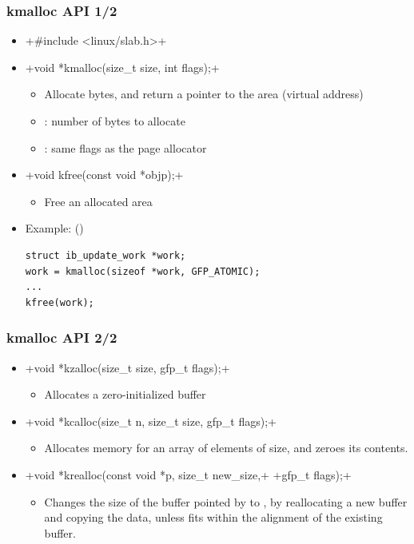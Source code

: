 \begin{frame}[fragile]
  \frametitle{kmalloc API 1/2}
  \begin{itemize}
  \item {}+#include <linux/slab.h>+
  \item {}+void *kmalloc(size_t size, int flags);+
    \begin{itemize}
    \item Allocate  bytes, and return a pointer to the area
      (virtual address)
    \item {}: number of bytes to allocate
    \item {}: same flags as the page allocator
    \end{itemize}
  \item {}+void kfree(const void *objp);+
    \begin{itemize}
    \item Free an allocated area
    \end{itemize}
  \item Example: ()
\begin{verbatim}
struct ib_update_work *work;
work = kmalloc(sizeof *work, GFP_ATOMIC);
...
kfree(work);
\end{verbatim}
  \end{itemize}
\end{frame}

\begin{frame}[fragile]
  \frametitle{kmalloc API 2/2}
  \begin{itemize}
  \item {}+void *kzalloc(size_t size, gfp_t flags);+
    \begin{itemize}
    \item Allocates a zero-initialized buffer
    \end{itemize}
  \item {}+void *kcalloc(size_t n, size_t size, gfp_t flags);+
    \begin{itemize}
    \item Allocates memory for an array of  elements of
       size, and zeroes its contents.
    \end{itemize}
  \item {}+void *krealloc(const void *p, size_t new_size,+
    +gfp_t flags);+
    \begin{itemize}
    \item Changes the size of the buffer pointed by  to
      , by reallocating a new buffer and copying the
      data, unless  fits within the alignment of
      the existing buffer.
    \end{itemize}
  \end{itemize}
\end{frame}

